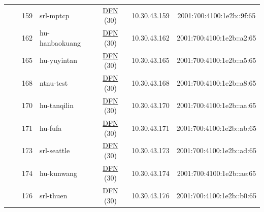 \begin{small}
\begin{center}
\begin{longtable}{|c|c|c|c|c|c|c|c|}
  &  & \tiny{159} & \multicolumn{1}{|l|}{\tiny{srl-mptcp}} & \multicolumn{2}{|c|}{\tiny{\href{https://www.dfn.de}{DFN} (30)}} & \tiny{10.30.43.159} & \tiny{2001:700:4100:1e2b::9f:65} \\* \cline{3-3}\cline{4-4}\cline{5-5}\cline{6-6}\cline{7-7}\cline{8-8}
  &  & \tiny{162} & \multicolumn{1}{|l|}{\tiny{hu-hanbaokuang}} & \multicolumn{2}{|c|}{\tiny{\href{https://www.dfn.de}{DFN} (30)}} & \tiny{10.30.43.162} & \tiny{2001:700:4100:1e2b::a2:65} \\* \cline{3-3}\cline{4-4}\cline{5-5}\cline{6-6}\cline{7-7}\cline{8-8}
  &  & \tiny{165} & \multicolumn{1}{|l|}{\tiny{hu-yuyintan}} & \multicolumn{2}{|c|}{\tiny{\href{https://www.dfn.de}{DFN} (30)}} & \tiny{10.30.43.165} & \tiny{2001:700:4100:1e2b::a5:65} \\* \cline{3-3}\cline{4-4}\cline{5-5}\cline{6-6}\cline{7-7}\cline{8-8}
  &  & \tiny{168} & \multicolumn{1}{|l|}{\tiny{ntnu-test}} & \multicolumn{2}{|c|}{\tiny{\href{https://www.dfn.de}{DFN} (30)}} & \tiny{10.30.43.168} & \tiny{2001:700:4100:1e2b::a8:65} \\* \cline{3-3}\cline{4-4}\cline{5-5}\cline{6-6}\cline{7-7}\cline{8-8}
  &  & \tiny{170} & \multicolumn{1}{|l|}{\tiny{hu-tanqilin}} & \multicolumn{2}{|c|}{\tiny{\href{https://www.dfn.de}{DFN} (30)}} & \tiny{10.30.43.170} & \tiny{2001:700:4100:1e2b::aa:65} \\* \cline{3-3}\cline{4-4}\cline{5-5}\cline{6-6}\cline{7-7}\cline{8-8}
  &  & \tiny{171} & \multicolumn{1}{|l|}{\tiny{hu-fufa}} & \multicolumn{2}{|c|}{\tiny{\href{https://www.dfn.de}{DFN} (30)}} & \tiny{10.30.43.171} & \tiny{2001:700:4100:1e2b::ab:65} \\* \cline{3-3}\cline{4-4}\cline{5-5}\cline{6-6}\cline{7-7}\cline{8-8}
  &  & \tiny{173} & \multicolumn{1}{|l|}{\tiny{srl-seattle}} & \multicolumn{2}{|c|}{\tiny{\href{https://www.dfn.de}{DFN} (30)}} & \tiny{10.30.43.173} & \tiny{2001:700:4100:1e2b::ad:65} \\* \cline{3-3}\cline{4-4}\cline{5-5}\cline{6-6}\cline{7-7}\cline{8-8}
  &  & \tiny{174} & \multicolumn{1}{|l|}{\tiny{hu-kunwang}} & \multicolumn{2}{|c|}{\tiny{\href{https://www.dfn.de}{DFN} (30)}} & \tiny{10.30.43.174} & \tiny{2001:700:4100:1e2b::ae:65} \\* \cline{3-3}\cline{4-4}\cline{5-5}\cline{6-6}\cline{7-7}\cline{8-8}
  &  & \tiny{176} & \multicolumn{1}{|l|}{\tiny{srl-thuen}} & \multicolumn{2}{|c|}{\tiny{\href{https://www.dfn.de}{DFN} (30)}} & \tiny{10.30.43.176} & \tiny{2001:700:4100:1e2b::b0:65} \\* \cline{3-3}\cline{4-4}\cline{5-5}\cline{6-6}\cline{7-7}\cline{8-8}

\end{longtable}
\end{center}
\end{small}
